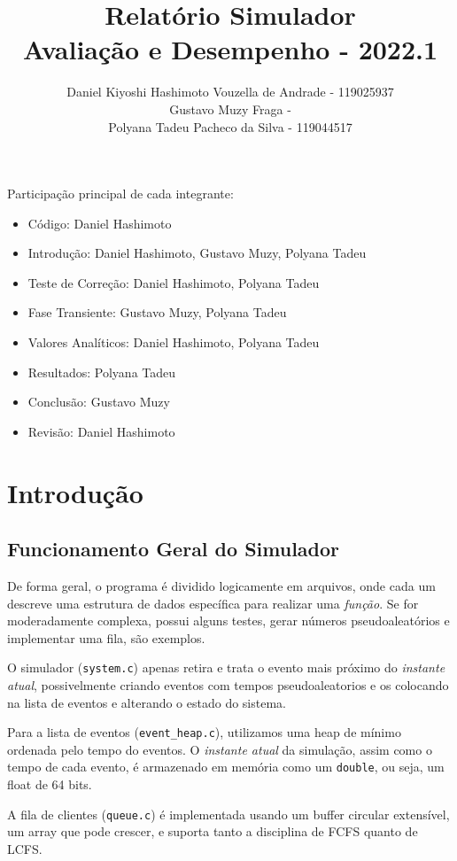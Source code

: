 \documentclass[a4paper]{article}
\title{Relatório Simulador\\
  Avaliação e Desempenho - 2022.1}
\author{Daniel Kiyoshi Hashimoto Vouzella de Andrade - 119025937
  \\
Gustavo Muzy Fraga -
  \\
Polyana Tadeu Pacheco da Silva - 119044517
}
\date{}
\newcommand{\arq}{\texttt}
\newcommand{\inlcode}{\texttt}
\begin{document}
\maketitle

\vfill

Participação principal de cada integrante:
\begin{itemize}
    \item \large Código:
    \hfill Daniel Hashimoto
    \item \large Introdução:
    \hfill Daniel Hashimoto, Gustavo Muzy, Polyana Tadeu
    \item \large Teste de Correção:
    \hfill Daniel Hashimoto, Polyana Tadeu
    \item \large Fase Transiente:
    \hfill Gustavo Muzy, Polyana Tadeu
    \item \large Valores Analíticos:
    \hfill Daniel Hashimoto, Polyana Tadeu
    \item \large Resultados:
    \hfill Polyana Tadeu
    \item \large Conclusão:
    \hfill Gustavo Muzy
    \item \large Revisão:
    \hfill Daniel Hashimoto
\end{itemize}

\newpage
\section{Introdução}
\subsection{Funcionamento Geral do Simulador}
De forma geral,
o programa é dividido logicamente em arquivos,
onde cada um descreve uma estrutura de dados
específica para realizar uma \emph{função}.
Se for moderadamente complexa, possui alguns testes,
gerar números pseudoaleatórios e implementar uma fila,
são exemplos.

O simulador (\arq{system.c})
apenas retira e trata o evento mais próximo do \emph{instante atual},
possivelmente criando eventos com tempos pseudoaleatorios
e os colocando na lista de eventos e alterando o estado do sistema.

Para a lista de eventos (\arq{event\_heap.c}),
utilizamos uma heap de mínimo ordenada pelo tempo do eventos.
O \emph{instante atual} da simulação,
assim como o tempo de cada evento,
é armazenado em memória como um \inlcode{double}, ou seja,
um float de 64 bits.

A fila de clientes (\arq{queue.c})
é implementada usando um buffer circular extensível,
um array que pode crescer,
e suporta tanto a disciplina de FCFS quanto de LCFS.
\end{document}
